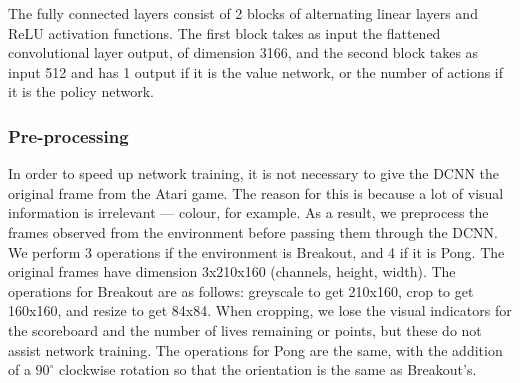 \documentclass[12pt,a4paper]{article}
\begin{document}
The fully connected layers consist of 2 blocks of alternating linear layers and ReLU activation functions. The first block takes as input the flattened convolutional layer output, of dimension 3166, and the second block takes as input 512 and has 1 output if it is the value network, or the number of actions if it is the policy network. 

\subsubsection{Pre-processing}
In order to speed up network training, it is not necessary to give the DCNN the original frame from the Atari game. The reason for this is because a lot of visual information is irrelevant --- colour, for example. As a result, we preprocess the frames observed from the environment before passing them through the DCNN. We perform 3 operations if the environment is Breakout, and 4 if it is Pong. The original frames have dimension 3x210x160 (channels, height, width). The operations for Breakout are as follows: greyscale to get 210x160, crop to get 160x160, and resize to get 84x84. When cropping, we lose the visual indicators for the scoreboard and the number of lives remaining or points, but these do not assist network training. The operations for Pong are the same, with the addition of a $90^{\circ}$ clockwise rotation so that the orientation is the same as Breakout's.

\begin{figure}[h]
    \centering
    \hfill
    \caption{}
\end{figure}
    
\end{document}
